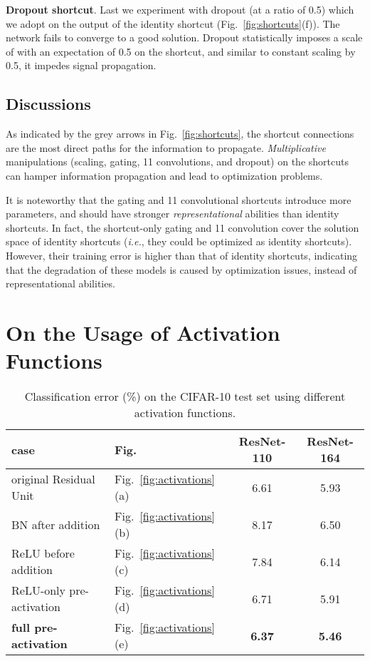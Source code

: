 \documentclass[runningheads]{llncs}
\def\ie{\emph{i.e.}}
\begin{document}
\textbf{Dropout shortcut}. Last we experiment with dropout \cite{Hinton2012} (at a ratio of 0.5) which we adopt on the output of the identity shortcut (Fig.~\ref{fig:shortcuts}(f)). The network fails to converge to a good solution. Dropout statistically imposes a scale of  with an expectation of 0.5 on the shortcut, and similar to constant scaling by 0.5, it impedes signal propagation.

\subsection{Discussions}

As indicated by the grey arrows in Fig.~\ref{fig:shortcuts}, the shortcut connections are the most direct paths for the information to propagate. \emph{Multiplicative} manipulations (scaling, gating, 11 convolutions, and dropout) on the shortcuts can hamper information propagation and lead to optimization problems.

It is noteworthy that the gating and 11 convolutional shortcuts introduce more parameters, and should have stronger \emph{representational} abilities than identity shortcuts. In fact, the shortcut-only gating and 11 convolution cover the solution space of identity shortcuts (\ie, they could be optimized as identity shortcuts). However, their training error is higher than that of identity shortcuts, indicating that the degradation of these models is caused by optimization issues, instead of representational abilities.


\section{On the Usage of Activation Functions}
\label{sec:activations}


\renewcommand\arraystretch{1.3}
\setlength{\tabcolsep}{6pt}
\begin{table}[t]
\caption{Classification error (\%) on the CIFAR-10 test set using different activation functions.}\label{tab:activations}
\centering
\fontsize{8pt}{1em}\selectfont
\begin{tabular}{l|l|c|c}
\hline
case & Fig. & ResNet-110 & ResNet-164 \\
\hline
\hline
original Residual Unit \cite{He2016} & Fig.~\ref{fig:activations}(a) & 6.61 & 5.93 \\
\hline
BN after addition & Fig.~\ref{fig:activations}(b) & 8.17 & 6.50 \\
\hline
ReLU before addition & Fig.~\ref{fig:activations}(c) & 7.84 & 6.14 \\
ReLU-only pre-activation & Fig.~\ref{fig:activations}(d) & 6.71 & 5.91 \\
\textbf{full pre-activation} & Fig.~\ref{fig:activations}(e) & \textbf{6.37} & \textbf{5.46} \\
\hline
\end{tabular}
\end{table}
\end{document}
